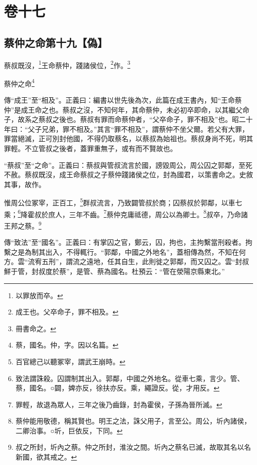 

\chapter{卷十七}


\section{蔡仲之命第十九【偽】}


蔡叔既沒，\footnote{以罪放而卒。}王命蔡仲，踐諸侯位，\footnote{成王也。父卒命子，罪不相及。}作。\footnote{冊書命之。}

蔡仲之命\footnote{蔡，國名。仲，字。因以名篇。}


{\noindent\zhuan{}\fzbyks 傳“成王”至“相及”。正義曰：編書以世先後為次，此篇在成王書內，知“王命蔡仲”是成王命之也。蔡叔之沒，不知何年，其命蔡仲，未必初卒即命，以其繼父命子，故系之蔡叔之後也。蔡叔有罪而命蔡仲者，“父卒命子，罪不相及”也。昭二十年曰：“父子兄弟，罪不相及。”其言“罪不相及”，謂蔡仲不坐父爾。若父有大罪，罪當絕滅，正可別封他國，不得仍取蔡名，以蔡叔為始祖也。蔡叔身尚不死，明其罪輕。不立管叔之後者，蓋罪重無子，或有而不賢故也。 \par}

{\noindent\shu{}\fzkt “蔡叔”至“之命”。正義曰：蔡叔與管叔流言於國，謗毀周公，周公囚之郭鄰，至死不赦。蔡叔既沒，成王命蔡叔之子蔡仲踐諸侯之位，封為國君，以策書命之。史敘其事，故作。 \par}

惟周公位冢宰，正百工，\footnote{百官總己以聽冢宰，謂武王崩時。}群叔流言，乃致闢管叔於商；囚蔡叔於郭鄰，以車七乘；\footnote{致法謂誅殺。囚謂制其出入。郭鄰，中國之外地名。從車七乘，言少。管、蔡，國名。○闢，婢亦反，徐扶亦反。乘，繩證反。從，才用反。}降霍叔於庶人，三年不齒。\footnote{罪輕，故退為眾人，三年之後乃齒錄，封為霍侯，子孫為晉所滅。}蔡仲克庸祗德，周公以為卿士。\footnote{蔡仲能用敬德，稱其賢也。明王之法，誅父用子，言至公。周公，圻內諸侯，二卿治事。○圻，巨依反，下同。}叔卒，乃命諸王邦之蔡。\footnote{叔之所封，圻內之蔡。仲之所封，淮汝之間。圻內之蔡名已滅，故取其名以名新國，欲其戒之。}


{\noindent\zhuan{}\fzbyks 傳“致法”至“國名”。正義曰：有掌囚之官，鄭云，囚，拘也，主拘繫當刑殺者。拘繫之是為制其出入，不得輒行。“郭鄰，中國之外地名”，蓋相傳為然，不知在何方。雲“流宥五刑”，謂流之遠地，任其自生，此則徙之郭鄰，而又囚之。雲“封叔鮮于管，封叔度於蔡”，是管、蔡為國名。杜預云：“管在滎陽京縣東北。” \par}

